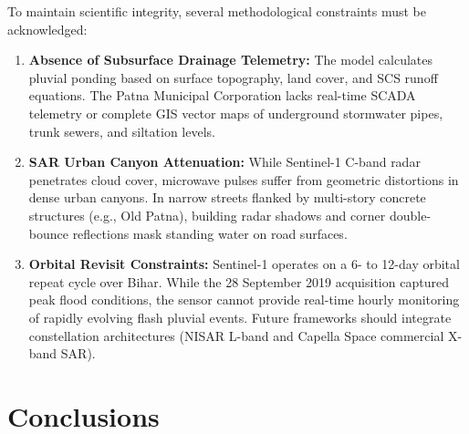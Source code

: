\documentclass[OA,linenum]{InterPore}
\begin{document}
To maintain scientific integrity, several methodological constraints must be acknowledged:
\begin{enumerate}
    \item \textbf{Absence of Subsurface Drainage Telemetry:} The model calculates pluvial ponding based on surface topography, land cover, and SCS runoff equations. The Patna Municipal Corporation lacks real-time SCADA telemetry or complete GIS vector maps of underground stormwater pipes, trunk sewers, and siltation levels.
    \item \textbf{SAR Urban Canyon Attenuation:} While Sentinel-1 C-band radar penetrates cloud cover, microwave pulses suffer from geometric distortions in dense urban canyons. In narrow streets flanked by multi-story concrete structures (e.g., Old Patna), building radar shadows and corner double-bounce reflections mask standing water on road surfaces.
    \item \textbf{Orbital Revisit Constraints:} Sentinel-1 operates on a 6- to 12-day orbital repeat cycle over Bihar. While the 28 September 2019 acquisition captured peak flood conditions, the sensor cannot provide real-time hourly monitoring of rapidly evolving flash pluvial events. Future frameworks should integrate constellation architectures (NISAR L-band and Capella Space commercial X-band SAR).
\end{enumerate}

\section{Conclusions}
\end{document}
